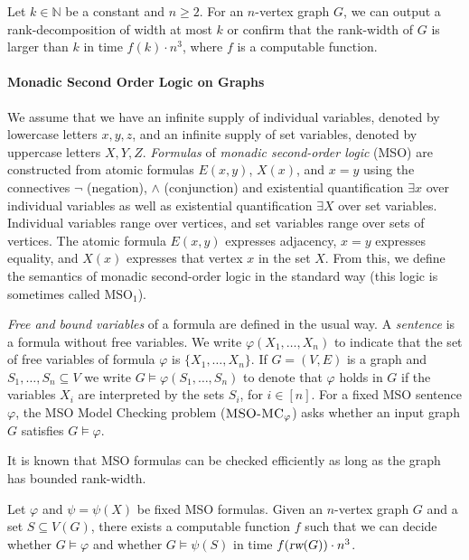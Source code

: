 \documentclass{llncs}
\newcommand{\Nat}{\mathbb{N}}
\newcommand{\MSO}{\mbox{MSO}\xspace}
\newcommand{\MSOMC}[1]{\textsc{MSO-MC${}_{#1}$}}
\newcommand{\rw}{\text{\normalfont\slshape rw}}
\begin{document}
\begin{theorem}\label{thm:rankdecomp} Let $k \in \Nat$ be a constant and
  $n \geq 2$. For an $n$-vertex graph $G$, we can output a
  rank-decomposition of width at most $k$ or confirm that the
  rank-width of $G$ is larger than $k$ in time $f(k)\cdot n^3$, where $f$ is a computable function.
\end{theorem}

\paragraph{Monadic Second Order Logic on Graphs}
We assume that we have an infinite supply of individual variables,
denoted by lowercase letters $x,y,z$, and an infinite supply of set
variables, denoted by uppercase letters $X,Y,Z$. \emph{Formulas} of
\emph{monadic second-order logic} (MSO) are constructed from atomic
formulas $E(x,y)$, $X(x)$, and $x = y$ using the connectives $\neg$
(negation), $\wedge$ (conjunction) and existential quantification
$\exists x$ over individual variables as well as existential
quantification $\exists X$ over set variables. Individual variables
range over vertices, and set variables range over sets of
vertices. The atomic formula $E(x,y)$ expresses adjacency, $x = y$
expresses equality, and $X(x)$ expresses that vertex $x$ in the set
$X$. From this, we define the semantics of monadic second-order logic
in the standard way (this logic is sometimes called $\MSO_1$).

\emph{Free and bound variables} of a formula are defined in the usual way. A
\emph{sentence} is a formula without free variables. We write $\varphi(X_1,
\dots, X_n)$ to indicate that the set of free variables of formula $\varphi$
is $\{X_1, \dots, X_n\}$. If $G = (V,E)$ is a graph and $S_1, \dots, S_n
\subseteq V$ we write $G \models \varphi(S_1, \dots, S_n)$ to denote that
$\varphi$ holds in $G$ if the variables $X_i$ are interpreted by the sets
$S_i$, for $i \in [n]$. For a fixed \MSO sentence $\varphi$, the MSO Model Checking problem ($\MSOMC{\varphi}$) asks whether an input graph $G$ satisfies $G\models \varphi$.

It is known that MSO formulas can be checked efficiently as long as the graph has bounded rank-width.

\begin{theorem}\label{thm:msorankwidth}
  Let $\varphi$ and $\psi=\psi(X)$ be fixed
  \MSO formulas. Given an $n$-vertex graph $G$ and a set $S\subseteq V(G)$, there exists a computable function $f$ such that we can decide whether $G \models \varphi$ and whether $G\models \psi(S)$ in time $f(\rw(G))\cdot n^3$.
\end{theorem}
\end{document}
